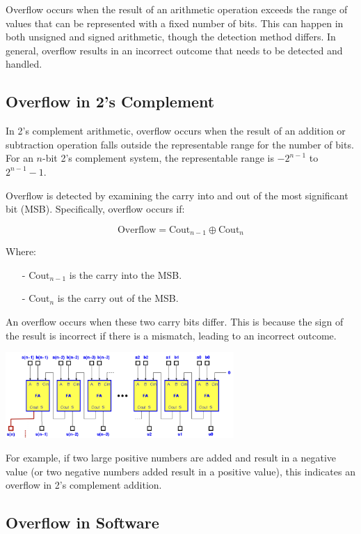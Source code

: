 Overflow occurs when the result of an arithmetic operation exceeds the range of values that can be represented with a fixed number of bits. This can happen in both unsigned and signed arithmetic, though the detection method differs. In general, overflow results in an incorrect outcome that needs to be detected and handled.

\subsection{Overflow in 2's Complement}

In 2's complement arithmetic, overflow occurs when the result of an addition or subtraction operation falls outside the representable range for the number of bits. For an \(n\)-bit 2's complement system, the representable range is \(-2^{n-1}\) to \(2^{n-1} - 1\).

Overflow is detected by examining the carry into and out of the most significant bit (MSB). Specifically, overflow occurs if:

\[
\text{Overflow} = \text{Cout}_{n-1} \oplus \text{Cout}_n
\]

Where:
\begin{itemize}
    \item[-] \(\text{Cout}_{n-1}\) is the carry into the MSB.
    \item[-] \(\text{Cout}_n\) is the carry out of the MSB.
\end{itemize}

An overflow occurs when these two carry bits differ. This is because the sign of the result is incorrect if there is a mismatch, leading to an incorrect outcome.

\begin{center}
    \includegraphics[width=0.65\textwidth]{chapters/chapter1e/images/sum.png}
\end{center}

For example, if two large positive numbers are added and result in a negative value (or two negative numbers added result in a positive value), this indicates an overflow in 2's complement addition.

\subsection{Overflow in Software}

